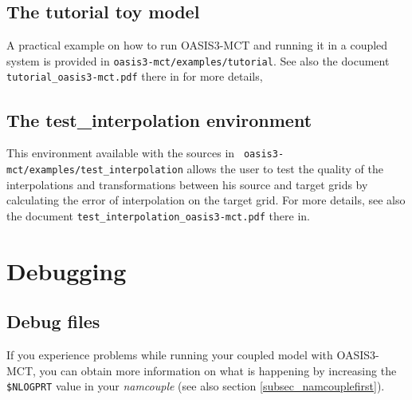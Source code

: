\subsection{The tutorial toy model}
\label{subsec_tutorial}

A practical example on how to run OASIS3-MCT and running it in a
coupled system is provided in {\tt oasis3-mct/examples/tutorial}. See also the document {\tt tutorial\_oasis3-mct.pdf} there in for
more details,

\subsection{The test\_interpolation environment}
\label{subsec_testinterpolation}

This environment available with the sources in {\tt
  oasis3-mct/examples/test\_interpolation} allows the user to test the
quality of the interpolations and transformations between his source
and target grids by calculating the error of interpolation on the
target grid. For more details, see also the document {\tt test\_interpolation\_oasis3-mct.pdf} there in.

\section{Debugging}
\label{subsec_debug}

\subsection{Debug files}
If you experience problems while running your coupled model with
OASIS3-MCT, you can obtain more information on what is happening by
increasing the {\tt \$NLOGPRT} value in your {\it namcouple} (see also section
\ref{subsec_namcouplefirst}).

